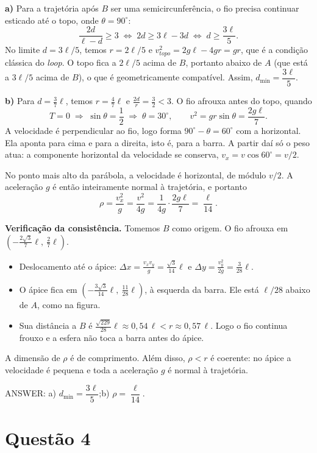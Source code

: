 \documentclass{article}%
\begin{document}
\textbf{a)} Para a trajetória após $B$ ser uma semicircunferência, o fio precisa continuar esticado até o topo, onde $\theta=90^\circ$:
\[
\frac{2d}{\ell-d}\ge 3 \;\Longleftrightarrow\; 2d \ge 3\ell-3d \;\Longleftrightarrow\; d\ge \frac{3\ell}{5}.
\]
No limite $d=3\ell/5$, temos $r=2\ell/5$ e $v_{topo}^2=2g\ell-4gr=gr$, que é a condição clássica do \textit{loop}. O topo fica a $2\ell/5$ acima de $B$, portanto abaixo de $A$ (que está a $3\ell/5$ acima de $B$), o que é geometricamente compatível. Assim, $d_{\min}=\dfrac{3\ell}{5}$.

\textbf{b)} Para $d=\tfrac{3}{7}\ell$, temos $r=\tfrac{4}{7}\ell$ e $\tfrac{2d}{r}=\tfrac{3}{2}<3$. O fio afrouxa antes do topo, quando
\[
T=0 \;\Longrightarrow\; \sin\theta=\frac{1}{2}\;\Longrightarrow\;\theta=30^\circ,
\qquad
v^2 = gr\sin\theta = \frac{2g\ell}{7}.
\]
A velocidade é perpendicular ao fio, logo forma $90^\circ-\theta=60^\circ$ com a horizontal. Ela aponta para cima e para a direita, isto é, para a barra. A partir daí só o peso atua: a componente horizontal da velocidade se conserva, $v_x=v\cos 60^\circ=v/2$.

No ponto mais alto da parábola, a velocidade é horizontal, de módulo $v/2$. A aceleração $g$ é então inteiramente normal à trajetória, e portanto
\[
\rho=\frac{v_x^2}{g}=\frac{v^2}{4g}=\frac{1}{4g}\cdot\frac{2g\ell}{7}=\frac{\ell}{14}.
\]

\textbf{Verificação da consistência.} Tomemos $B$ como origem. O fio afrouxa em $\left(-\tfrac{2\sqrt3}{7}\ell,\ \tfrac{2}{7}\ell\right)$.
\begin{itemize}
\item Deslocamento até o ápice: $\Delta x=\tfrac{v_xv_y}{g}=\tfrac{\sqrt3}{14}\ell$ e $\Delta y=\tfrac{v_y^2}{2g}=\tfrac{3}{28}\ell$.
\item O ápice fica em $\left(-\tfrac{3\sqrt3}{14}\ell,\ \tfrac{11}{28}\ell\right)$, à esquerda da barra. Ele está $\ell/28$ abaixo de $A$, como na figura.
\item Sua distância a $B$ é $\tfrac{\sqrt{229}}{28}\ell\approx 0{,}54\,\ell<r\approx 0{,}57\,\ell$. Logo o fio continua frouxo e a esfera não toca a barra antes do ápice.
\end{itemize}
A dimensão de $\rho$ é de comprimento. Além disso, $\rho<r$ é coerente: no ápice a velocidade é pequena e toda a aceleração $g$ é normal à trajetória.

\medskip
ANSWER: a) $d_{\min}=\dfrac{3\ell}{5}$;\quad b) $\rho=\dfrac{\ell}{14}$.%
\newpage%
\section*{Questão 4}
\end{document}
